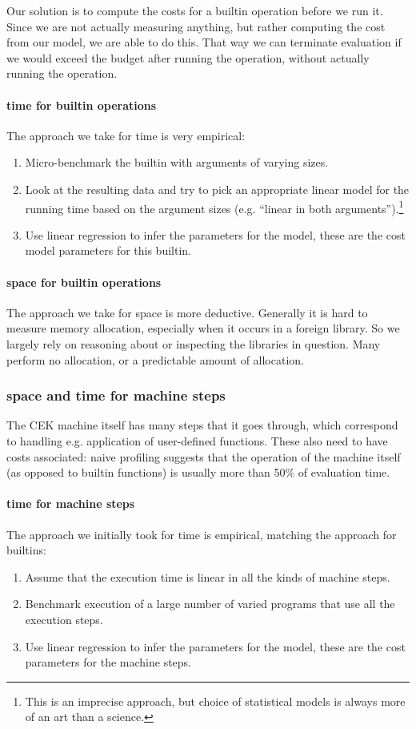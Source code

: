Our solution is to compute the costs for a builtin operation before we run it.
Since we are not actually measuring anything, but rather computing the cost from our model, we are able to do this.
That way we can terminate evaluation if we would exceed the budget after running the operation, without actually running the operation.

\paragraph{\gls{time} for builtin operations}
The approach we take for \gls{time} is very empirical:
\begin{enumerate}
\item
  Micro-benchmark the builtin with arguments of varying sizes.
\item
  Look at the resulting data and try to pick an appropriate linear model for the running time based on the argument sizes (e.g. ``linear in both arguments'').\footnote{
  This is an imprecise approach, but choice of statistical models is always more of an art than a science.
  }
\item
  Use linear regression to infer the parameters for the model, these are the cost model parameters for this builtin.
\end{enumerate}

\paragraph{\gls{space} for builtin operations}
The approach we take for \gls{space} is more deductive.
Generally it is hard to measure memory allocation, especially when it occurs in a foreign library.
So we largely rely on reasoning about or inspecting the libraries in question.
Many perform no allocation, or a predictable amount of allocation.

\subsubsection{\gls{space} and \gls{time} for machine steps}
The CEK machine itself has many steps that it goes through, which correspond to handling e.g. application of user-defined functions.
These also need to have costs associated: naive profiling suggests that the operation of the machine itself (as opposed to builtin functions) is usually more than 50\% of evaluation time.

\paragraph{\gls{time} for machine steps}
The approach we initially took for \gls{time} is empirical, matching the approach for builtins:
\begin{enumerate}
\item Assume that the execution time is linear in all the kinds of machine steps.
\item Benchmark execution of a large number of varied programs that use all the execution steps.
\item Use linear regression to infer the parameters for the model, these are the cost parameters for the machine steps.
\end{enumerate}

